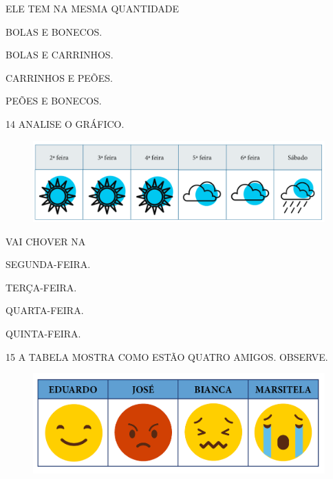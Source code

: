 ELE TEM NA MESMA QUANTIDADE

\begin{escolha}[itemsep=0pt]
\item BOLAS E BONECOS.

\item BOLAS E CARRINHOS.

\item CARRINHOS E PEÕES.

\item PEÕES E BONECOS.
\end{escolha}

\pagebreak
\num{14} ANALISE O GRÁFICO.


\begin{figure}[htpb!]
\includegraphics[width=\textwidth]{./media/SAEB_1ANO_MAT_FIGURA127.png}
\end{figure}

VAI CHOVER NA

\begin{escolha}[itemsep=0pt]
\item SEGUNDA-FEIRA.

\item TERÇA-FEIRA.

\item QUARTA-FEIRA.

\item QUINTA-FEIRA.
\end{escolha}

\num{15} A TABELA MOSTRA COMO ESTÃO QUATRO AMIGOS. OBSERVE.


\begin{figure}[htpb!]
\includegraphics[width=\textwidth]{./media/SAEB_1ANO_MAT_FIGURA128.png}
\end{figure}

